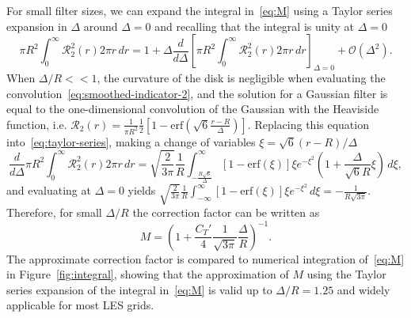 \documentclass{article}
\begin{document}
For small filter sizes, we can expand the integral in~\eqref{eq:M} using a Taylor series expansion in $\Delta$ around $\Delta = 0$ and recalling that the integral is unity at $\Delta = 0$
\begin{equation}
\label{eq:taylor-series}
\pi R^2 \int_0^\infty \mathcal{R}^2_2(r) 2 \pi r \, dr = 1 + \Delta \frac{d}{d\Delta} \left[\pi R^2 \int_0^\infty \mathcal{R}^2_2(r) 2 \pi r \, dr \right]_{\Delta = 0} + \mathcal{O}(\Delta^2).
\end{equation}
When $\Delta/R <<1$, the curvature of the disk is negligible when evaluating the convolution~\eqref{eq:smoothed-indicator-2}, and the solution for a Gaussian filter is equal to the one-dimensional convolution of the Gaussian with the Heaviside function, i.e. $\mathcal{R}_2(r) = \frac{1}{\pi R^2} \frac{1}{2} \left[ 1 - \mathrm{erf}\left(\sqrt{6}\frac{r-R}{\Delta}\right)\right]$. Replacing this equation into~\eqref{eq:taylor-series}, making a change of variables $\xi = \sqrt{6} (r-R)/\Delta$
\begin{equation}
\frac{d}{d\Delta} \pi R^2 \int_0^\infty \mathcal{R}^2_2(r) 2 \pi r \, dr  = \sqrt{\frac{2}{3\pi}}\frac{1}{R} \int_{-\frac{R\sqrt{6}}{\Delta}}^\infty \left[ 1 - \mathrm{erf}(\xi)\right] \xi e^{-\xi^2} \left( 1 +\frac{\Delta}{\sqrt{6}R} \xi\right) \, d \xi,
\end{equation}
and evaluating at $\Delta = 0$ yields $\sqrt{\frac{2}{3\pi}}\frac{1}{R} \int_{-\infty}^\infty \left[ 1 - \mathrm{erf}(\xi)\right] \xi e^{-\xi^2} \, d \xi = - \frac{1}{R\sqrt{3\pi}}$. Therefore, for small $\Delta/R$ the correction factor can be written as
\begin{equation}
\label{eq:M-approx}
M = \left(1 + \frac{C_T'}{4}\frac{1}{\sqrt{3\pi}}\frac{\Delta}{R}\right)^{-1}.
\end{equation}
The approximate correction factor is compared to numerical integration of~\eqref{eq:M} in Figure~\ref{fig:integral}, showing that the approximation of $M$ using the Taylor series expansion of the integral in~\eqref{eq:M} is valid up to $\Delta/R = 1.25$ and widely applicable for most LES grids.
\end{document}

